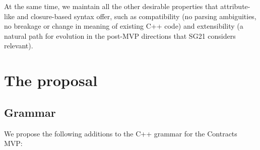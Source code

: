  At the same time, we maintain all the other desirable properties that attribute-like and closure-based syntax offer, such as compatibility (no parsing ambiguities, no breakage or change in meaning of existing C++ code) and extensibility (a natural path for evolution in the post-MVP directions that SG21 considers relevant).
 

\section{The proposal}

\subsection{Grammar}
\label{subsec:grammar}

We propose the following additions to the C++ grammar for the Contracts MVP:

